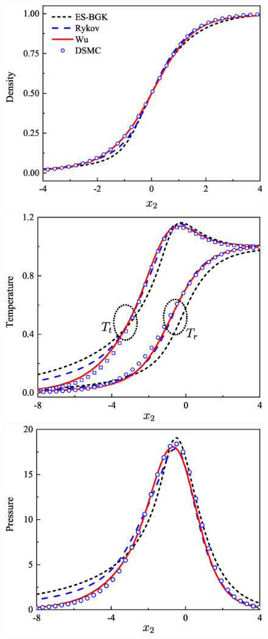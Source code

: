 \begin{figure}[t]
	\centering
	{\includegraphics[scale=0.3,clip=true]{Fig/01NSW1.eps}} \quad
	{\includegraphics[scale=0.3,clip=true]{Fig/01NSW2.eps}} \\
	\vskip 0.5cm
	{\includegraphics[scale=0.3,clip=true]{Fig/01NSW3.eps}} \quad

\end{figure}

